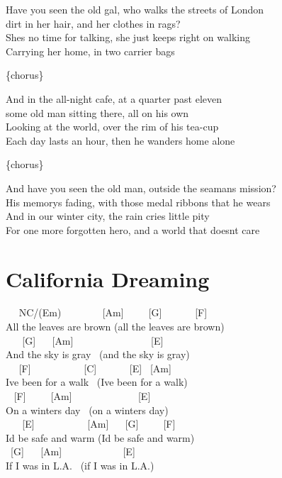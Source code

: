 \documentclass[
  letterpaper,
  twoside=false]{scrbook}
\begin{document}
Have you seen the old gal, who walks the streets of London\\
dirt in her hair, and her clothes in rags?\\
She\textquotesingle s no time for talking, she just keeps right on
walking\\
Carrying her home, in two carrier bags

\{chorus\}

And in the all-night cafe, at a quarter past eleven\\
some old man sitting there, all on his own\\
Looking at the world, over the rim of his tea-cup\\
Each day lasts an hour, then he wanders home alone

\{chorus\}

And have you seen the old man, outside the seaman\textquotesingle s
mission?\\
His memory\textquotesingle s fading, with those medal ribbons that he
wears\\
And in our winter city, the rain cries little pity\\
For one more forgotten hero, and a world that doesn\textquotesingle t
care

\hypertarget{california-dreaming}{%
\chapter{California Dreaming}\label{california-dreaming}}

~ ~NC/(Em) ~ ~ ~ ~ ~{[}Am{]} ~ ~ ~{[}G{]} ~ ~ ~ ~{[}F{]}\\
All the leaves are brown (all the leaves are brown)\\
\hspace*{0.333em} ~ ~ {[}G{]} ~ ~{[}Am{]} ~ ~ ~ ~ ~ ~ ~ ~ ~ {[}E{]}\\
And the sky is gray ~(and the sky is gray)\\
\hspace*{0.333em} ~ ~{[}F{]} ~ ~ ~ ~ ~ ~ {[}C{]} ~ ~ ~ ~{[}E{]}
~{[}Am{]}\\
I\textquotesingle ve been for a walk ~(I\textquotesingle ve been for a
walk)\\
\hspace*{0.333em} ~ {[}F{]} ~ ~ ~{[}Am{]} ~ ~ ~ ~ ~ ~ ~ ~{[}E{]}\\
On a winter\textquotesingle s day ~(on a winter\textquotesingle s day)\\
\hspace*{0.333em} ~ ~ {[}E{]} ~ ~ ~ ~ ~ ~ {[}Am{]} ~ ~{[}G{]} ~ ~
~{[}F{]}\\
I\textquotesingle d be safe and warm (I\textquotesingle d be safe and
warm)\\
\hspace*{0.333em} ~{[}G{]} ~ ~{[}Am{]} ~ ~ ~ ~ ~ ~ ~ {[}E{]}\\
If I was in L.A. ~(if I was in L.A.)
\end{document}
